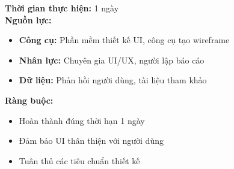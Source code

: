 {\begin{minipage}{\textwidth}
\begin{itemize}
    \end{itemize}
    \vspace{0.5cm}
    \noindent \textbf{Thời gian thực hiện:} 1 ngày \\
    \noindent \textbf{Nguồn lực:}
    \begin{itemize}
        \item \textbf{Công cụ:} Phần mềm thiết kế UI, công cụ tạo wireframe
        \item \textbf{Nhân lực:} Chuyên gia UI/UX, người lập báo cáo
        \item \textbf{Dữ liệu:} Phản hồi người dùng, tài liệu tham khảo
    \end{itemize}
    \vspace{0.5cm}
    \noindent \textbf{Ràng buộc:}
    \begin{itemize}
        \item Hoàn thành đúng thời hạn 1 ngày
        \item Đảm bảo UI thân thiện với người dùng
        \item Tuân thủ các tiêu chuẩn thiết kế
    \end{itemize}
    \end{minipage}
}

\newpage %

% 
